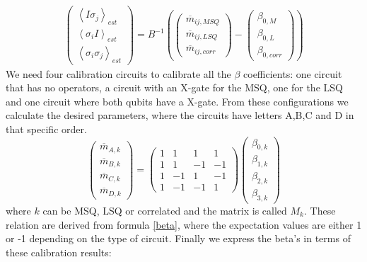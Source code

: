 \begin{equation}
\begin{split}
\begin{pmatrix}
\left\langle I\sigma_j\right\rangle_{est}  \\
\left\langle \sigma_iI\right\rangle_{est}  \\
\left\langle \sigma_i\sigma_j\right\rangle_{est}
\end{pmatrix}=B^{-1}\left(\begin{pmatrix}
\overline{m}_{ij,MSQ}  \\
\overline{m}_{ij,LSQ}  \\
\overline{m}_{ij,corr}
\end{pmatrix}-\begin{pmatrix}
\beta_{0,M}  \\
\beta_{0,L}  \\
\beta_{0,corr}
\end{pmatrix}\right)
\end{split}
\end{equation}
We need four calibration circuits to calibrate all the $\beta$ coefficients: one circuit that has no operators, a circuit with an X-gate for the MSQ, one for the LSQ and one circuit where both qubits have a X-gate. From these configurations we calculate the desired parameters, where the circuits have letters A,B,C and D in that specific order.
\begin{equation}
\begin{pmatrix}
	\overline{m}_{A,k} \\
	\overline{m}_{B,k} \\
	\overline{m}_{C,k} \\
	\overline{m}_{D,k}
\end{pmatrix}=\begin{pmatrix}
1&1&1&1\\
1&1&-1&-1\\
1&-1&1&-1\\
1&-1&-1&1
\end{pmatrix}\begin{pmatrix}
\beta_{0,k} \\
\beta_{1,k} \\
\beta_{2,k} \\
\beta_{3,k}
\end{pmatrix}
\end{equation}
where $k$ can be MSQ, LSQ or correlated and the matrix is called $M_k$. These relation are derived from formula \ref{beta}, where the expectation values are either 1 or -1 depending on the type of circuit. Finally we express the beta's in terms of these calibration results: 
